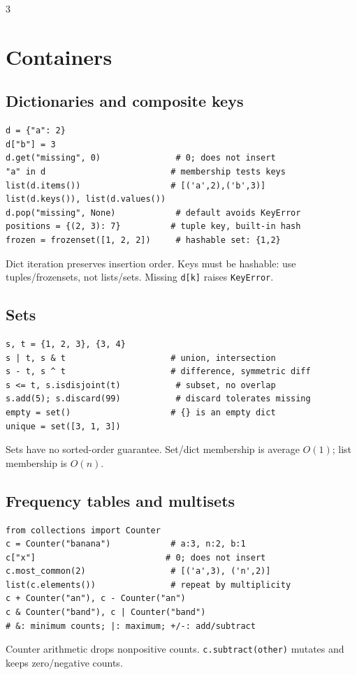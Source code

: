 \documentclass[9pt]{extarticle}
\let\referenceSubsection\subsection
\renewcommand{\subsection}{\needspace{4\baselineskip}\referenceSubsection}
\newcommand{\hint}[1]{{\small #1\par}}
\begin{document}
\begin{multicols*}{3}
\section{Containers}

\subsection{Dictionaries and composite keys}
\begin{lstlisting}[label=py:dict]
d = {"a": 2}
d["b"] = 3
d.get("missing", 0)               # 0; does not insert
"a" in d                         # membership tests keys
list(d.items())                  # [('a',2),('b',3)]
list(d.keys()), list(d.values())
d.pop("missing", None)            # default avoids KeyError
positions = {(2, 3): 7}          # tuple key, built-in hash
frozen = frozenset([1, 2, 2])     # hashable set: {1,2}
\end{lstlisting}
\hint{Dict iteration preserves insertion order. Keys must be hashable:
use tuples/frozensets, not lists/sets. Missing \texttt{d[k]} raises
\texttt{KeyError}.}

\subsection{Sets}
\begin{lstlisting}[label=py:sets]
s, t = {1, 2, 3}, {3, 4}
s | t, s & t                     # union, intersection
s - t, s ^ t                     # difference, symmetric diff
s <= t, s.isdisjoint(t)           # subset, no overlap
s.add(5); s.discard(99)           # discard tolerates missing
empty = set()                    # {} is an empty dict
unique = set([3, 1, 3])
\end{lstlisting}
\hint{Sets have no sorted-order guarantee.
Set/dict membership is average $O(1)$; list membership is $O(n)$.}

\subsection{Frequency tables and multisets}
\begin{lstlisting}[label=py:counter]
from collections import Counter
c = Counter("banana")            # a:3, n:2, b:1
c["x"]                          # 0; does not insert
c.most_common(2)                 # [('a',3), ('n',2)]
list(c.elements())               # repeat by multiplicity
c + Counter("an"), c - Counter("an")
c & Counter("band"), c | Counter("band")
# &: minimum counts; |: maximum; +/-: add/subtract
\end{lstlisting}
\hint{Counter arithmetic drops nonpositive counts.
\texttt{c.subtract(other)} mutates and keeps zero/negative counts.}


\end{multicols*}
\end{document}
